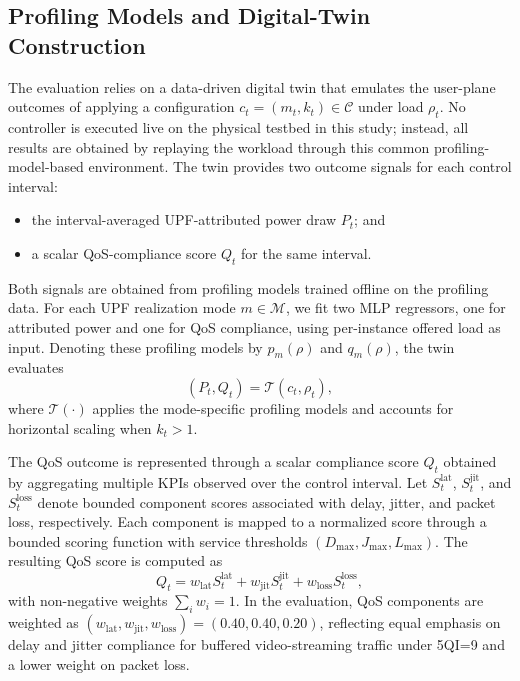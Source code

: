 \documentclass[a4paper,fleqn]{cas-sc}
\begin{document}
\subsection{Profiling Models and Digital-Twin Construction}
\label{subsec:twin_construction}

The evaluation relies on a data-driven digital twin that emulates the user-plane outcomes of applying a configuration $c_t=(m_t,k_t)\in\mathcal{C}$ under load $\rho_t$. No controller is executed live on the physical testbed in this study; instead, all results are obtained by replaying the workload through this common profiling-model-based environment. The twin provides two outcome signals for each control interval:
\begin{itemize}
    \item the interval-averaged UPF-attributed power draw $P_t$; and
    \item a scalar QoS-compliance score $Q_t$ for the same interval.
\end{itemize}

Both signals are obtained from profiling models trained offline on the profiling data. For each UPF realization mode $m\in\mathcal{M}$, we fit two MLP regressors, one for attributed power and one for QoS compliance, using per-instance offered load as input. Denoting these profiling models by $p_m(\rho)$ and $q_m(\rho)$, the twin evaluates
\begin{equation}
(P_t,Q_t)=\mathcal{T}(c_t,\rho_t),
\end{equation}
where $\mathcal{T}(\cdot)$ applies the mode-specific profiling models and accounts for horizontal scaling when $k_t>1$.

The QoS outcome is represented through a scalar compliance score $Q_t$ obtained by aggregating multiple KPIs observed over the control interval. Let $S^{\mathrm{lat}}_t$, $S^{\mathrm{jit}}_t$, and $S^{\mathrm{loss}}_t$ denote bounded component scores associated with delay, jitter, and packet loss, respectively. Each component is mapped to a normalized score through a bounded scoring function with service thresholds $(D_{\max},J_{\max},L_{\max})$. The resulting QoS score is computed as
\begin{equation}
Q_t = w_{\mathrm{lat}} S^{\mathrm{lat}}_t + w_{\mathrm{jit}} S^{\mathrm{jit}}_t + w_{\mathrm{loss}} S^{\mathrm{loss}}_t,
\label{eq:qos_weighted}
\end{equation}
with non-negative weights $\sum_i w_i = 1$. In the evaluation, QoS components are weighted as $(w_{\mathrm{lat}}, w_{\mathrm{jit}}, w_{\mathrm{loss}}) = (0.40, 0.40, 0.20)$, reflecting equal emphasis on delay and jitter compliance for buffered video-streaming traffic under 5QI=9 and a lower weight on packet loss.
\end{document}
